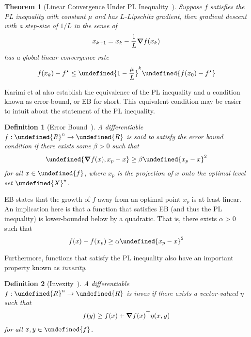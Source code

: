 \documentclass[11pt]{article}  %
\newtheorem{theorem}{Theorem}
\newtheorem{definition}{Definition}
\let\mbb\undefined
\newcommand{\mbb}[1]{\mathbb{#1}}
\let\mcal\undefined
\newcommand{\mcal}[1]{\mathcal{#1}}
\let\parens\undefined
\newcommand{\parens}[1]{\left(#1\right)}
\let\brackets\undefined
\newcommand{\brackets}[1]{\left[#1\right]}
\let\angles\undefined
\newcommand{\angles}[1]{\langle#1\rangle}
\let\norm\undefined
\newcommand{\norm}[1]{\lVert #1 \rVert}
\let\dom\undefined
\DeclareMathOperator{\dom}{dom}
\begin{document}
\begin{theorem}[Linear Convergence Under PL Inequality~\cite{karimi2016linear, polyak1963gradient, lojasiewicz1961probleme}]
  Suppose \(f\) satisfies the PL inequality with constant \(\mu\)
  and has \(L\)-Lipschitz
  gradient,
  then gradient descent with a step-size of \(1/L\)
  in the sense of
  \begin{align}
    x_{k + 1} = x_k - \frac{1}{L} \grad f(x_k)
  \end{align}
  has a global linear convergence rate
  \begin{align}
    f(x_k) - f^\star
      \leq \parens{1 - \frac{\mu}{L}}^k \brackets{f(x_0) - f^\star}
  \end{align}
\end{theorem}

Karimi et al also establish the equivalence of the PL inequality
and a condition known as error-bound, or EB for short.
This equivalent condition may be easier to intuit about the statement of
the PL inequality.

\begin{definition}[Error Bound~\cite{karimi2016linear}]
  A differentiable \(f : \mbb{R}^n \to \mbb{R}\)
  is said to satisfy the error bound condition if
  there exists some \(\beta > 0\) such that
  \begin{align}
    \angles{\grad f (x), x_p - x} \geq \beta \norm{x_p - x}^2
  \end{align}
  for all \(x \in \dom{f}\),
  where \(x_p\) is the projection of \(x\) onto
  the optimal level set \(\mcal{X}^\star\).
\end{definition}

EB states that the growth of \(f\) away from an optimal point
\(x_p\) is at least linear.
An implication here is that a function that satisfies
EB (and thus the PL inequality) is lower-bounded below by a quadratic.
That is, there exists \(\alpha > 0\) such that
\begin{align}
  f(x) - f(x_p) \geq \alpha \norm{x_p - x}^2
\end{align}

Furthermore, functions that satisfy the PL inequality
also have an important property known as \textit{invexity}.

\begin{definition}[Invexity~\cite{karimi2016linear}]
  A differentiable \(f : \mbb{R}^n \to \mbb{R}\)
  is invex if there exists a vector-valued \(\eta\)
  such that
  \begin{align}
    f(y) \geq f(x) + \grad f(x)^\top \eta (x, y)
  \end{align}
  for all \(x, y \in \dom{f}\).
\end{definition}
\end{document}
